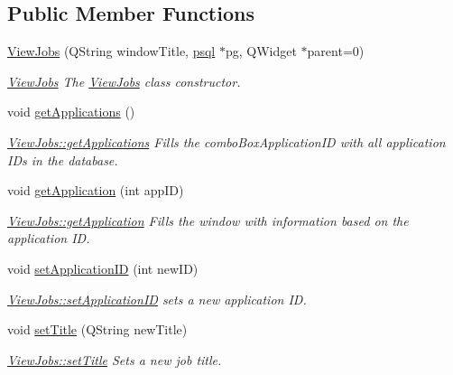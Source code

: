 \subsection*{Public Member Functions}
\begin{DoxyCompactItemize}
\item 
\mbox{\hyperlink{class_view_jobs_ac78f48cc812a0348a233f33dc78a71cc}{View\+Jobs}} (Q\+String window\+Title, \mbox{\hyperlink{classpsql}{psql}} $\ast$pg, Q\+Widget $\ast$parent=0)
\begin{DoxyCompactList}\small\item\em \mbox{\hyperlink{class_view_jobs}{View\+Jobs}} The \mbox{\hyperlink{class_view_jobs}{View\+Jobs}} class constructor. \end{DoxyCompactList}\item 
\mbox{\label{class_view_jobs_af97593f0db01caee0febfe774a823e9c}} 
void \mbox{\hyperlink{class_view_jobs_af97593f0db01caee0febfe774a823e9c}{get\+Applications}} ()
\begin{DoxyCompactList}\small\item\em \mbox{\hyperlink{class_view_jobs_af97593f0db01caee0febfe774a823e9c}{View\+Jobs\+::get\+Applications}} Fills the combo\+Box\+Application\+ID with all application I\+Ds in the database. \end{DoxyCompactList}\item 
void \mbox{\hyperlink{class_view_jobs_ae9c1c806aa1dd5082b38a1dc9cbec39e}{get\+Application}} (int app\+ID)
\begin{DoxyCompactList}\small\item\em \mbox{\hyperlink{class_view_jobs_ae9c1c806aa1dd5082b38a1dc9cbec39e}{View\+Jobs\+::get\+Application}} Fills the window with information based on the application ID. \end{DoxyCompactList}\item 
void \mbox{\hyperlink{class_view_jobs_acd43a8c32ab9bca7e40ecc99e51da9b8}{set\+Application\+ID}} (int new\+ID)
\begin{DoxyCompactList}\small\item\em \mbox{\hyperlink{class_view_jobs_acd43a8c32ab9bca7e40ecc99e51da9b8}{View\+Jobs\+::set\+Application\+ID}} sets a new application ID. \end{DoxyCompactList}\item 
void \mbox{\hyperlink{class_view_jobs_abfe1969197cde57ea049c1b7d91cd4f5}{set\+Title}} (Q\+String new\+Title)
\begin{DoxyCompactList}\small\item\em \mbox{\hyperlink{class_view_jobs_abfe1969197cde57ea049c1b7d91cd4f5}{View\+Jobs\+::set\+Title}} Sets a new job title. \end{DoxyCompactList}\item 

\end{DoxyCompactItemize}
